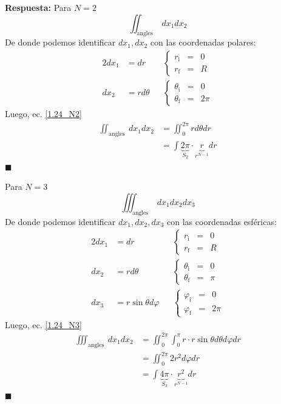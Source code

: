 \documentclass[]{article}
\numberwithin{equation}{section}
\newcommand{\0}{\textcolor{gray}{0}}
\newcommand{\qed}{\hfill\(\blacksquare\)}
\begin{document}
\begin{enumerate}
	\textbf{Respuesta:}
	Para \(N=2\)
	\begin{equation}
		\iint_{\text {angles }} dx_1 dx_2 \label{1.24_N2}
	\end{equation}
	De donde podemos identificar \(dx_1, dx_2\) con las coordenadas polares:
	\begin{alignat*}{2}
		dx_1 &= dr&&\left\lbrace \begin{matrix}
			r_\text{i} &=& 0\\
			r_\text{f} &=& R
		\end{matrix}\right. \\
		dx_2 &= r d\theta &&\left\lbrace \begin{matrix}
			\theta_\text{i} &=& 0\\
			\theta_\text{f} &=& 2\pi
		\end{matrix}\right. 
	\end{alignat*}
	Luego, ec. \ref{1.24_N2}
	\begin{align}
		\iint_{\text {angles }} dx_1 dx_2 &= \iint_{0}^{2\pi} r d\theta dr\nonumber\\
		&= \int \underbrace{2\pi}_{S_2} \cdot \underbrace{r}_{r^{N-1}} dr
	\end{align}
	\qed
	
	Para \(N=3\)
	\begin{equation}
		\iiint_{\text {angles }} dx_1 dx_2 dx_3 \label{1.24_N3}
	\end{equation}
	De donde podemos identificar \(dx_1, dx_2, dx_3\) con las coordenadas esféricas:
	\begin{alignat*}{2}
		dx_1 &= dr&&\left\lbrace \begin{matrix}
			r_\text{i} &=& 0\\
			r_\text{f} &=& R
		\end{matrix}\right. \\
		dx_2 &= r d\theta &&\left\lbrace \begin{matrix}
			\theta_\text{i} &=& 0\\
			\theta_\text{f} &=& \pi
		\end{matrix}\right. \\
		dx_3 &= r \sin \theta d\varphi &&\left\lbrace \begin{matrix}
		\varphi_\text{i} &=& 0\\
		\varphi_\text{f} &=& 2\pi
		\end{matrix}\right.
	\end{alignat*}
	Luego, ec. \ref{1.24_N3}
	\begin{align}
		\iiint_{\text {angles }} dx_1 dx_2 &= \iint_{0}^{2\pi}\int_{0}^{\pi} r \cdot r \sin \theta d\theta d\varphi dr\nonumber\\
		&= \iint_{0}^{2\pi} 2 r^2  d\varphi dr\nonumber\\
		&= \int \underbrace{4\pi}_{S_3} \cdot \underbrace{r^2}_{r^{N-1}} dr
	\end{align}
	\qed
	

\end{enumerate}
\end{document}

